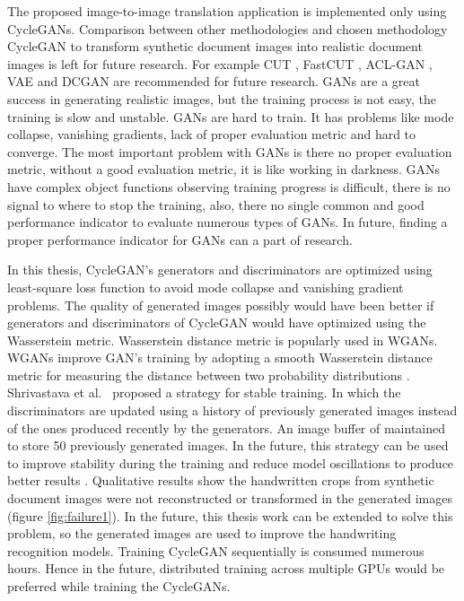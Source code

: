 The proposed image-to-image translation application is implemented only using \acp{CycleGAN}. Comparison between other methodologies and chosen methodology \ac{CycleGAN} to transform synthetic document images into realistic document images is left for future research. For example \ac{CUT} \cite{park2020contrastive}, \ac{FastCUT} \cite{park2020contrastive}, \ac{ACL-GAN} \cite{zhao2021unpaired}, \ac{VAE} \cite{Kingma_2019} and \ac{DCGAN} \cite{radford2016unsupervised} are recommended for future research. \acp{GAN} are a great success in generating realistic images, but the training process is not easy, the training is slow and unstable. \acp{GAN} are hard to train. It has problems like mode collapse, vanishing gradients, lack of proper evaluation metric and hard to converge. The most important problem with \acp{GAN} is there no proper evaluation metric, without a good evaluation metric, it is like working in darkness. \acp{GAN} have complex object functions observing training progress is difficult, there is no signal to where to stop the training, also, there no single common and good performance indicator to evaluate numerous types of \acp{GAN}. In future, finding a proper performance indicator for \acp{GAN} can a part of research. 

In this thesis, \ac{CycleGAN}'s generators and discriminators are optimized using least-square loss function \cite{mao2017squares} to avoid mode collapse and vanishing gradient problems. The quality of generated images possibly would have been better if generators and discriminators of \ac{CycleGAN} would have optimized using the Wasserstein metric. Wasserstein distance metric is popularly used in \acp{WGAN}. \acp{WGAN} improve \ac{GAN}'s training by adopting a smooth Wasserstein distance metric for measuring the distance between two probability distributions \cite{arjovsky2017wasserstein}. Shrivastava et al.\ \cite{shrivastava2017learning} proposed a strategy for stable training. In which the discriminators are updated using a history of previously generated images instead of the ones produced recently by the generators. An image buffer of maintained to store 50 previously generated images. In the future, this strategy can be used to improve stability during the training and reduce model oscillations to produce better results \cite{shrivastava2017learning}. Qualitative results show the handwritten crops from synthetic document images were not reconstructed or transformed in the generated images (figure \ref{fig:failure1}). In the future, this thesis work can be extended to solve this problem, so the generated images are used to improve the handwriting recognition models. Training \ac{CycleGAN} sequentially is consumed numerous hours. Hence in the future, distributed training across multiple GPUs would be preferred while training the \acp{CycleGAN}.

